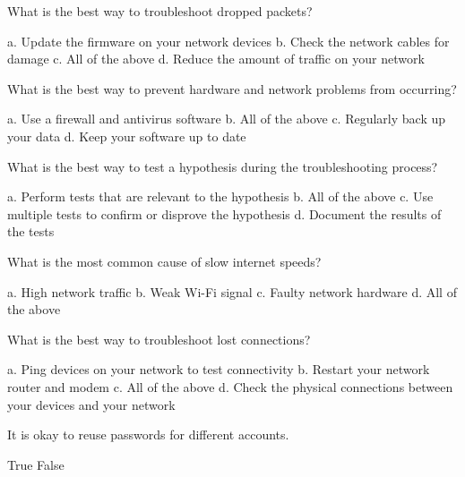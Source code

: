 \documentclass{exam}
\begin{document}
\begin{questions}
\question What is the best way to troubleshoot dropped packets?
\begin{checkboxes}
\choice a. Update the firmware on your network devices
\choice b. Check the network cables for damage
\CorrectChoice c. All of the above
\choice d. Reduce the amount of traffic on your network
\end{checkboxes}

\question What is the best way to prevent hardware and network problems from occurring?
\begin{checkboxes}
\choice a. Use a firewall and antivirus software
\CorrectChoice b. All of the above
\choice c. Regularly back up your data
\choice d. Keep your software up to date
\end{checkboxes}

\question What is the best way to test a hypothesis during the troubleshooting process?
\begin{checkboxes}
\choice a. Perform tests that are relevant to the hypothesis
\CorrectChoice b. All of the above
\choice c. Use multiple tests to confirm or disprove the hypothesis
\choice d. Document the results of the tests
\end{checkboxes}

\question What is the most common cause of slow internet speeds?
\begin{checkboxes}
\choice a. High network traffic
\choice b. Weak Wi-Fi signal
\choice c. Faulty network hardware
\CorrectChoice d. All of the above
\end{checkboxes}

\question What is the best way to troubleshoot lost connections?
\begin{checkboxes}
\choice a. Ping devices on your network to test connectivity
\choice b. Restart your network router and modem
\CorrectChoice c. All of the above
\choice d. Check the physical connections between your devices and your network
\end{checkboxes}

\question It is okay to reuse passwords for different accounts.
\begin{checkboxes}
\choice True
\CorrectChoice False
\end{checkboxes}

\end{questions}
\end{document}

